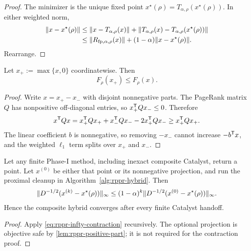 \begin{proof}
The minimizer is the unique fixed point
$x^\star(\rho)=T_{\alpha,\rho}(x^\star(\rho))$.  In either weighted norm,
\[
\begin{split}
  \lVert x-x^\star(\rho)\rVert
  &\leq\lVert x-T_{\alpha,\rho}(x)\rVert
       +\lVert T_{\alpha,\rho}(x)-T_{\alpha,\rho}(x^\star(\rho))\rVert\\
  &\leq\lVert R_{\mathrm{fp},\alpha,\rho}(x)\rVert+(1-\alpha)\lVert x-x^\star(\rho)\rVert.
\end{split}
\]
Rearrange.
\end{proof}

\begin{lemma}
\label{lem:rppr-positive-part}
Let $x_+:=\max\{x,0\}$ coordinatewise.  Then
\begin{equation}
  F_\rho(x_+)\leq F_\rho(x).
  \label{eq:rppr-positive-part}
\end{equation}
\end{lemma}

\begin{proof}
Write $x=x_+-x_-$ with disjoint nonnegative parts.  The PageRank matrix $Q$
has nonpositive off-diagonal entries, so $x_+^{\mathsf{T}} Qx_-\leq0$.  Therefore
\[
  x^{\mathsf{T}} Qx
  =x_+^{\mathsf{T}} Qx_++x_-^{\mathsf{T}} Qx_- -2x_+^{\mathsf{T}} Qx_-
  \geq x_+^{\mathsf{T}} Qx_+.
\]
The linear coefficient $b$ is nonnegative, so removing $-x_-$ cannot increase
$-b^{\mathsf{T}} x$, and the weighted $\ell_1$ term splits over $x_+$ and $x_-$.
\end{proof}

\begin{theorem}
\label{thm:rppr-hybrid-convergence}
Let any finite Phase-I method, including inexact composite Catalyst, return a
point.  Let $x^{(0)}$ be either that point or its nonnegative projection, and
run the proximal cleanup in Algorithm~\ref{alg:rppr-hybrid}.  Then
\begin{equation}
  \lVert D^{-1/2}(x^{(k)}-x^\star(\rho))\rVert_\infty
  \leq
  (1-\alpha)^k
  \lVert D^{-1/2}(x^{(0)}-x^\star(\rho))\rVert_\infty.
  \label{eq:rppr-hybrid-linear}
\end{equation}
Hence the composite hybrid converges after every finite Catalyst handoff.
\end{theorem}

\begin{proof}
Apply \cref{eq:rppr-infty-contraction} recursively.  The optional projection
is objective safe by \cref{lem:rppr-positive-part}; it is not required for the
contraction proof.
\end{proof}

